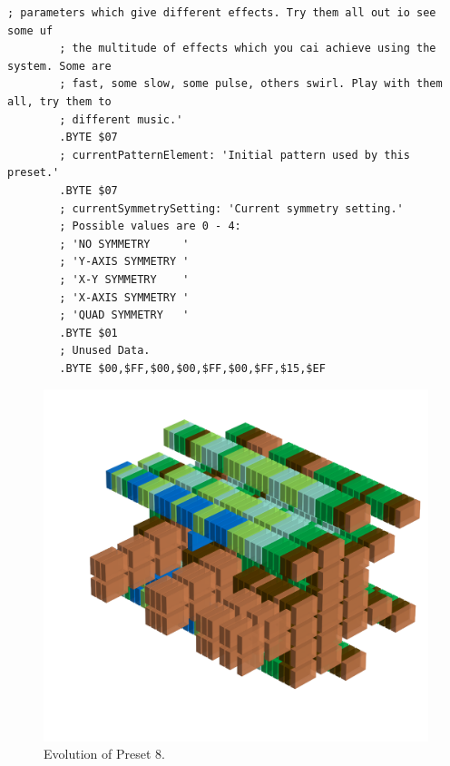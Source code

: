 \begin{lstlisting}[basicstyle=\tiny,caption=Source code for Preset 7.]
        ; parameters which give different effects. Try them all out io see some uf
        ; the multitude of effects which you cai achieve using the system. Some are
        ; fast, some slow, some pulse, others swirl. Play with them all, try them to
        ; different music.'
        .BYTE $07
        ; currentPatternElement: 'Initial pattern used by this preset.'
        .BYTE $07
        ; currentSymmetrySetting: 'Current symmetry setting.'
        ; Possible values are 0 - 4:
        ; 'NO SYMMETRY     '
        ; 'Y-AXIS SYMMETRY '
        ; 'X-Y SYMMETRY    '
        ; 'X-AXIS SYMMETRY '
        ; 'QUAD SYMMETRY   '
        .BYTE $01
        ; Unused Data.
        .BYTE $00,$FF,$00,$00,$FF,$00,$FF,$15,$EF
\end{lstlisting}


\clearpage                                                                 
\begin{figure}[H]                                                          
    \centering                                                             
    \begin{adjustbox}{width=14cm,center}                                   
      \includegraphics[width=14cm]{src/presets/pattern8-45.png}%
    \end{adjustbox}                                                        
\caption{Evolution of Preset 8.}                                           
\end{figure}                                                               
\clearpage                                                                 
                                                                           
